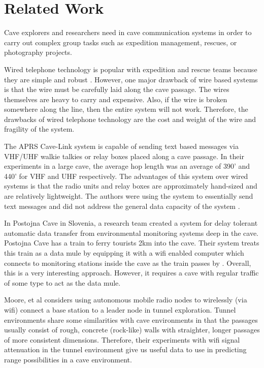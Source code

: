 \documentclass[10pt,twocolumn]{article}
\begin{document}
\section{Related Work}
Cave explorers and researchers need in cave communication systems in order to carry out complex group tasks such as expedition management, rescues, or photography projects.

Wired telephone technology is popular with expedition and rescue teams because they are simple and robust \cite{cavecomm}.
However, one major drawback of wire based systems is that the wire must be carefully laid along the cave passage. 
The wires themselves are heavy to carry and expensive.
Also, if the wire is broken somewhere along the line, then the entire system will not work.
Therefore, the drawbacks of wired telephone technology are the cost and weight of the wire and fragility of the system.

The APRS Cave-Link system is capable of sending text based messages via VHF/UHF walkie talkies or relay boxes placed along a cave passage.
In their experiments in a large cave, the average hop length was an average of 390' and 440' for VHF and UHF respectively.
The advantages of this system over wired systems is that the radio units and relay boxes are approximately hand-sized and are relatively lightweight.
The authors were using the system to essentially send text messages and did not address the general data capacity of the system \cite{cavelink}.

In Postojna Cave in Slovenia, a research team created a system for delay tolerant automatic data transfer from environmental monitoring systems deep in the cave.
Postojna Cave has a train to ferry tourists 2km into the cave.
Their system treats this train as a data mule by equipping it with a wifi enabled computer which connects to monitoring stations inside the cave as the train passes by \cite{postojna2014}.
Overall, this is a very interesting approach. 
However, it requires a cave with regular traffic of some type to act as the data mule.

Moore, et al \cite{moore2012} considers using autonomous mobile radio nodes to wirelessly (via wifi) connect a base station to a leader node in tunnel exploration. 
Tunnel environments share some similarities with cave environments in that the passages usually consist of rough, concrete (rock-like) walls with straighter, longer passages of more consistent dimensions. 
Therefore, their experiments with wifi signal attenuation in the tunnel environment give us useful data to use in predicting range possibilities in a cave environment.
\end{document}
